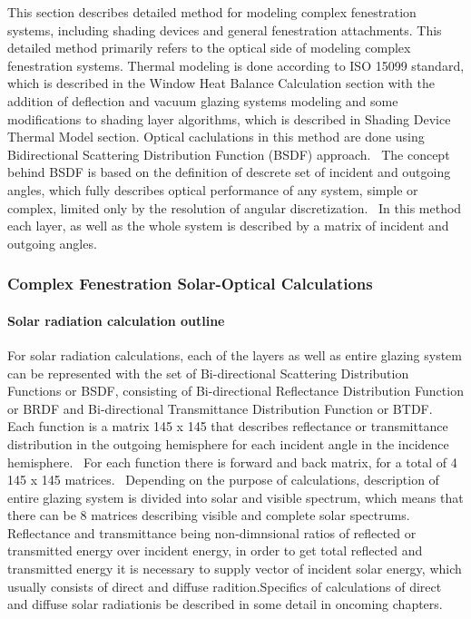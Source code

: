 This section describes detailed method for modeling complex fenestration systems, including shading devices and general fenestration attachments. This detailed method primarily refers to the optical side of modeling complex fenestration systems. Thermal modeling is done according to ISO 15099 standard, which is described in the Window Heat Balance Calculation section with the addition of deflection and vacuum glazing systems modeling and some modifications to shading layer algorithms, which is described in Shading Device Thermal Model section. Optical caclulations in this method are done using Bidirectional Scattering Distribution Function (BSDF) approach.~ The concept behind BSDF is based on the definition of descrete set of incident and outgoing angles, which fully describes optical performance of any system, simple or complex, limited only by the resolution of angular discretization.~ In this method each layer, as well as the whole system is described by a matrix of incident and outgoing angles.

\subsubsection{Complex Fenestration Solar-Optical Calculations}\label{complex-fenestration-solar-optical-calculations}

\paragraph{\texorpdfstring{\textbf{Solar radiation calculation outline}}{Solar radiation calculation outline}}\label{solar-radiation-calculation-outline}

For solar radiation calculations, each of the layers as well as entire glazing system can be represented with the set of Bi-directional Scattering Distribution Functions or BSDF, consisting of Bi-directional Reflectance Distribution Function or BRDF and Bi-directional Transmittance Distribution Function or BTDF.~ Each function is a matrix 145 x 145 that describes reflectance or transmittance distribution in the outgoing hemisphere for each incident angle in the incidence hemisphere.~ For each function there is forward and back matrix, for a total of 4 145 x 145 matrices.~ Depending on the purpose of calculations, description of entire glazing system is divided into solar and visible spectrum, which means that there can be 8 matrices describing visible and complete solar spectrums.~ Reflectance and transmittance being non-dimnsional ratios of reflected or transmitted energy over incident energy, in order to get total reflected and transmitted energy it is necessary to supply vector of incident solar energy, which usually consists of direct and diffuse radition.Specifics of calculations of direct and diffuse solar radiationis be described in some detail in oncoming chapters.

